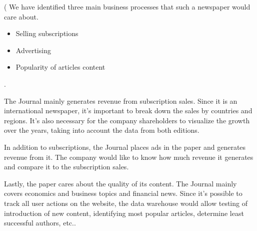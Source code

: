 (
We have identified three main business processes that such a newspaper would care about.
\begin{itemize}
    \item Selling subscriptions
    \item Advertising
    \item Popularity of articles content 
\end{itemize} .

The Journal mainly generates revenue from subscription sales. 
Since it is an international newspaper, it's important to break down the sales by countries and regions. It's also necessary for the company shareholders to visualize the growth over the years, taking into account the data from both editions.

In addition to subscriptions, the Journal places ads in the paper and generates revenue from
it. The company would like to know how much revenue it generates and compare it to the
subscription sales.

Lastly, the paper cares about the quality of its content. The Journal mainly covers economics and business topics and financial news. Since it's possible to track all user actions on the website, the data warehouse would allow testing of introduction of new content, identifying most popular articles, determine least successful authors, etc..



